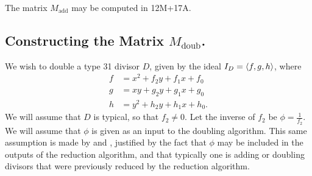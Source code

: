 \begin{lemma}
  \label{lem_Madd_op_count}
  The matrix $M_{\text{add}}$ may be computed in 12M+17A.
\end{lemma}



\subsection{Constructing the Matrix $M_{\text{doub}}$.}

We wish to double a type 31 divisor $D$, given by the ideal $I_D = \left\langle f,g,h \right\rangle$, where
\begin{align*}
  f &= x^2 + f_2y + f_1x + f_0 \\
  g &=  xy + g_2y + g_1x + g_0 \\
  h &= y^2 + h_2y + h_1x + h_0.
\end{align*}
We will assume that $D$ is typical, so that $f_2 \neq 0$.
Let the inverse of $f_2$ be $\phi = \frac 1 {f_2}$.
We will assume that $\phi$ is given as an input to the doubling algorithm.
This same assumption is made by \cite{salem07} and \cite{kmakdisi18},
justified by the fact that $\phi$ may be included in the outputs of the reduction algorithm,
and that typically one is adding or doubling divisors that were previously reduced by the reduction algorithm.

